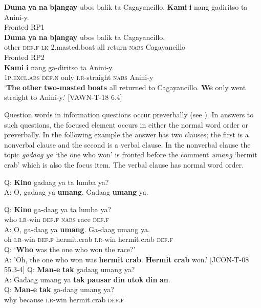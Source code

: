 \ea 
\label{bkm:Ref122614892}
\textbf{Duma}  \textbf{ya}  \textbf{na}  \textbf{bļangay}  ubos  balik  ta  Cagayancillo. \textbf{Kami}  \textbf{i}  nang  gadiritso  ta  Anini-y. \\\smallskip
Fronted RP1 \\
\gll \textbf{Duma}  \textbf{ya}  \textbf{na}  \textbf{bļangay}  ubos  balik  ta  Cagayancillo. \\
other  \textsc{def.f}  \textsc{lk}  2.masted.boat  all  return  \textsc{nabs}  Cagayancillo \\\smallskip
\newpage
Fronted RP2 \\
\gll \textbf{Kami}  \textbf{i}  nang  ga-diritso  ta  Anini-y. \\
1\textsc{p.excl.abs}  \textsc{def.n}  only  \textsc{i.r}-straight  \textsc{nabs}  Anini-y \\
\glt `\textbf{The} \textbf{other} \textbf{two-masted} \textbf{boats} all returned to Cagayancillo. \textbf{We} only went straight to Anini-y.’ [VAWN-T-18 6.4]
\z

Question words in information questions occur preverbally (see ).  In answers to such questions, the focused element occurs in either the normal word order or preverbally. In the following example the answer has two clauses; the first is a nonverbal clause and the second is a verbal clause. In the nonverbal clause the topic \textit{gadaag ya} ‘the one who won’ is fronted before the comment \textit{umang} ‘hermit crab’ which is also the focus item. The verbal clause has normal word order.

\ea 
Q: \textbf{Kino}  gadaag  ya  ta  lumba  ya? \\
A: O,  gadaag  ya  \textbf{umang}.  Gadaag  \textbf{umang}  ya. \\\smallskip

\gll Q: \textbf{Kino}  ga-daag  ya  ta  lumba  ya? \\
{} who  \textsc{i.r}-win  \textsc{def.f}  \textsc{nabs}  race  \textsc{def.f} \\

\gll A: O,  ga-daag  ya  \textbf{umang}. Ga-daag umang ya. \\
{} oh  \textsc{i.r}-win  \textsc{def.f}  hermit.crab \textsc{i.r}-win hermit.crab \textsc{def.f} \\

\glt Q: `\textbf{Who} was the one who won the race?' \\
A: 'Oh, the one who won was \textbf{hermit} \textbf{crab}. \textbf{Hermit} \textbf{crab} won.’ [JCON-T-08 55.3-4]
\z
\ea 
Q: \textbf{Man-e}  \textbf{tak}  gadaag  umang  ya? \\
A: Gadaag  umang  ya  \textbf{tak}  \textbf{pausar}  \textbf{din}  \textbf{utok}  \textbf{din}  \textbf{an}. \\\smallskip
\gll Q: \textbf{Man-e}  \textbf{tak}  ga-daag  umang  ya? \\
{} why  because  \textsc{i.r}-win  hermit.crab  \textsc{def.f} \\

